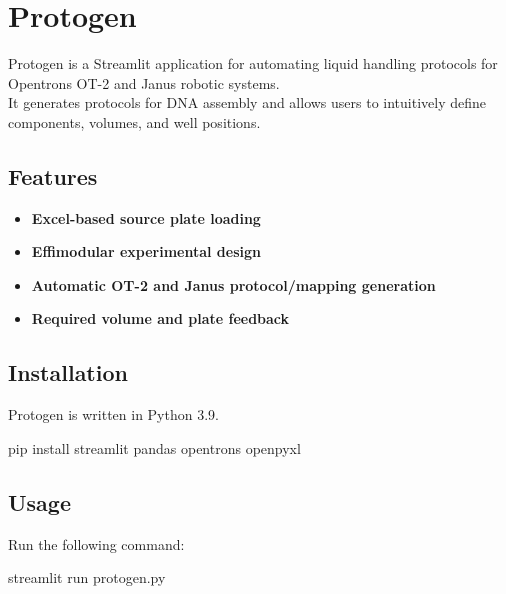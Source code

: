\documentclass[
  letterpaper,
  DIV=11,
  numbers=noendperiod]{scrartcl}
\author{}
\date{}
\newenvironment{Shaded}{\begin{snugshade}}{\end{snugshade}}
\newcommand{\ExtensionTok}[1]{\textcolor[rgb]{0.00,0.23,0.31}{#1}}
\newcommand{\NormalTok}[1]{\textcolor[rgb]{0.00,0.23,0.31}{#1}}
\providecommand{\tightlist}{%
  \setlength{\itemsep}{0pt}\setlength{\parskip}{0pt}}\usepackage{longtable,booktabs,array}
\begin{document}
\section{Protogen}\label{protogen}

Protogen is a Streamlit application for automating liquid handling
protocols for Opentrons OT-2 and Janus robotic systems.\\
It generates protocols for DNA assembly and allows users to intuitively
define components, volumes, and well positions.

\subsection{Features}\label{features}

\begin{itemize}
\tightlist
\item
  \textbf{Excel-based source plate loading}
\item
  \textbf{Effimodular experimental design}
\item
  \textbf{Automatic OT-2 and Janus protocol/mapping generation}
\item
  \textbf{Required volume and plate feedback}
\end{itemize}

\subsection{Installation}\label{installation}

Protogen is written in Python 3.9.

\begin{Shaded}
\begin{Highlighting}[]
\ExtensionTok{pip}\NormalTok{ install streamlit pandas opentrons openpyxl}
\end{Highlighting}
\end{Shaded}

\subsection{Usage}\label{usage}

Run the following command:

\begin{Shaded}
\begin{Highlighting}[]
\ExtensionTok{streamlit}\NormalTok{ run protogen.py}
\end{Highlighting}
\end{Shaded}
\end{document}
